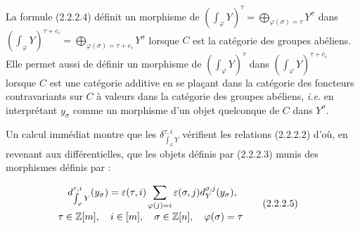 La formule (2.2.2.4) définit un morphisme de
$\left(\int_\varphi Y\right)^\tau
=\bigoplus_{\varphi(\sigma)=\tau}Y^\sigma$ dans
$\left(\int_\varphi Y\right)^{\tau+e_i}
=\bigoplus_{\varphi(\sigma)=\tau+e_i}Y^\sigma$ lorsque $C$ est la
catégorie des groupes abéliens. Elle permet aussi de définir un morphisme
de $\left(\int_\varphi Y\right)^\tau$ dans
$\left(\int_\varphi Y\right)^{\tau+e_i}$ lorsque $C$ est une catégorie
additive en se plaçant dans la catégorie des foncteurs contravariants sur
$C$ à valeurs dans la catégorie des groupes abéliens, \emph{i.e.} en
interprétant $y_\sigma$ comme un morphisme d'un objet quelconque de $C$
dans $Y^\sigma$.

Un calcul immédiat montre que les
$\delta_{\int_\varphi Y}^{\tau,i}$ vérifient les relations (2.2.2.2)
d'où, en revenant aux différentielles, que les objets définis par (2.2.2.3)
munis des morphismes définis par :

\begin{equation}
  \begin{aligned}
    d_{\int_\varphi Y}^{\tau,i}(y_\sigma)
      &=\varepsilon(\tau,i)
        \sum_{\varphi(j)=i}
          \varepsilon(\sigma,j)d_Y^{\sigma,j}(y_\sigma),\\[-1mm]
    &\hspace{-18mm}
      \tau\in\mathbb Z[m],\quad i\in[m],\quad
      \sigma\in\mathbb Z[n],\quad\varphi(\sigma)=\tau
  \end{aligned}
  \tag{2.2.2.5}
\end{equation}
